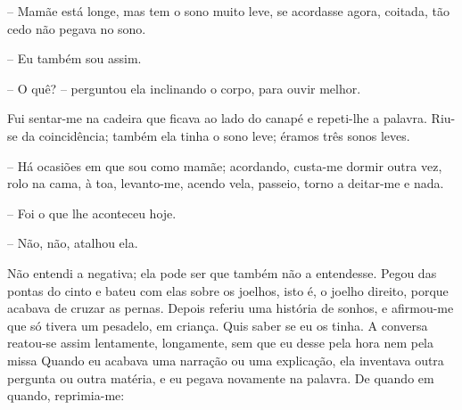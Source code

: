 -- Mamãe está longe, mas tem o sono muito leve, se acordasse agora,
coitada, tão cedo não pegava no sono.

-- Eu também sou assim.

-- O quê? -- perguntou ela inclinando o corpo, para ouvir melhor.

Fui sentar-me na cadeira que ficava ao lado do canapé e repeti-lhe a
palavra. Riu-se da coincidência; também ela tinha o sono leve; éramos
três sonos leves.

-- Há ocasiões em que sou como mamãe; acordando, custa-me dormir outra
vez, rolo na cama, à toa, levanto-me, acendo vela, passeio, torno a
deitar-me e nada.

-- Foi o que lhe aconteceu hoje.

-- Não, não, atalhou ela.

Não entendi a negativa; ela pode ser que também não a entendesse. Pegou
das pontas do cinto e bateu com elas sobre os joelhos, isto é, o joelho
direito, porque acabava de cruzar as pernas. Depois referiu uma história
de sonhos, e afirmou-me que só tivera um pesadelo, em criança. Quis
saber se eu os tinha. A conversa reatou-se assim lentamente, longamente,
sem que eu desse pela hora nem pela missa Quando eu acabava uma narração
ou uma explicação, ela inventava outra pergunta ou outra matéria, e eu
pegava novamente na palavra. De quando em quando, reprimia-me:

